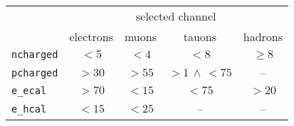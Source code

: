 \begin{tabular}{lcccc}
	\toprule
	&\multicolumn{4}{c}{selected channel}  \\ \cmidrule(r){2-5}
	 & electrons & muons & tauons & hadrons \\
	 \midrule
	\texttt{ncharged} & $< 5$  & $< 4$  & $< 8$ & $\geq 8$ \\
	\texttt{pcharged} & $> 30$ & $> 55$ & $>1\,\land\,<75$ & --\\
	\texttt{e\_ecal}  & $> 70$ & $< 15$  & $< 75$ & $> 20$ \\
	\texttt{e\_hcal}  & $< 15$  & $< 25$ & -- & -- \\
	\bottomrule
\end{tabular}